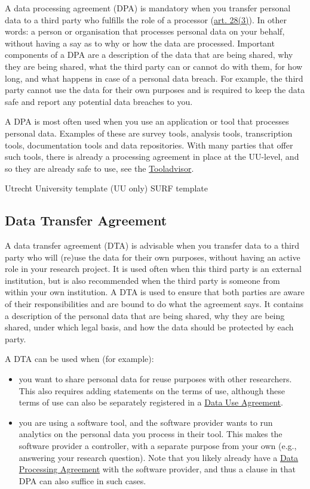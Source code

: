 \documentclass[
]{book}
\providecommand{\tightlist}{%
  \setlength{\itemsep}{0pt}\setlength{\parskip}{0pt}}
\begin{document}
A data processing agreement (DPA) is mandatory when you transfer personal data
to a third party who fulfills the role of a processor
(\href{https://gdpr-info.eu/art-28-gdpr/}{art. 28(3)}).
In other words: a person or organisation that processes personal data on your
behalf, without having a say as to why or how the data are processed. Important
components of a DPA are a description of the data that are being shared, why
they are being shared, what the third party can or cannot do with them, for how
long, and what happens in case of a personal data breach. For example, the third
party cannot use the data for their own purposes and is required to keep the
data safe and report any potential data breaches to you.

A DPA is most often used when you use an application or tool that processes
personal data. Examples of these are survey tools, analysis tools, transcription
tools, documentation tools and data repositories. With many parties that offer
such tools, there is already a processing agreement in place at the UU-level,
and so they are already safe to use, see the
\href{https://tools.uu.nl/}{Tooladvisor}.

Utrecht University template (UU only)
SURF template

\hypertarget{data-transfer-agreement}{%
\subsection{Data Transfer Agreement}\label{data-transfer-agreement}}

A data transfer agreement (DTA) is advisable when you transfer data to a third
party who will (re)use the data for their own purposes, without having an
active role in your research project. It is used often when this third party is
an external institution, but is also recommended when the third party is someone
from within your own institution. A DTA is used to ensure that both parties are
aware of their responsibilities and are bound to do what the agreement says. It
contains a description of the personal data that are being shared, why they are
being shared, under which legal basis, and how the data should be protected by
each party.

A DTA can be used when (for example):

\begin{itemize}
\tightlist
\item
  you want to share personal data for reuse purposes with other researchers.
  This also requires adding statements on the terms of use, although these terms
  of use can also be separately registered in a \protect\hyperlink{user-agreement}{Data Use Agreement}.
\item
  you are using a software tool, and the software provider wants to run
  analytics on the personal data you process in their tool. This makes the
  software provider a controller, with a separate purpose from your own (e.g.,
  answering your research question). Note that you likely already have a
  \protect\hyperlink{data-processing-agreement}{Data Processing Agreement} with the
  software provider, and thus a clause in that DPA can also suffice in such cases.
\end{itemize}
\end{document}

